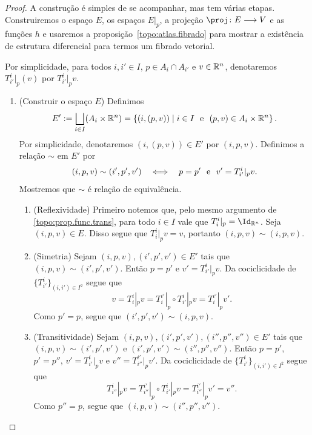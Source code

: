 \begin{proof}
A construção é simples de se acompanhar, mas tem várias etapas. Construiremos o espaço $E$, os espaços $E|_p$, a projeção $\proj\colon E \to V$ e as funções $h$ e usaremos a proposição~\ref{topo:atlas.fibrado} para mostrar a existência de estrutura diferencial para termos um fibrado vetorial.

Por simplicidade, para todos $i,i' \in I$, $p \in A_i \cap A_{i'}$ e $v \in \mathbb{R}^n$, denotaremos $T^i_{i'}|_p (v)$ por $T^i_{i'}|_p v$.
\begin{enumerate}
\item (Construir o espaço $E$) Definimos
	\begin{equation*}
	E' := \bigsqcup_{i \in I} (A_i \times \mathbb{R}^n) = \left\{(i,(p,v)) \;\middle\vert\; i \in I \text{\ \ e\ \ } (p,v) \in A_i \times \mathbb{R}^n \right\}.
	\end{equation*}
Por simplicidade, denotaremos $(i,(p,v)) \in E'$ por $(i,p,v)$. Definimos a relação $\sim$ em $E'$ por
	\begin{equation*}
	(i,p,v) \sim (i',p',v') \quad \Longleftrightarrow \quad p=p' \text{\ \ e\ \ } v'=T^i_{i'}|_p v.
	\end{equation*}
Mostremos que $\sim$ é relação de equivalência.
	
	\begin{enumerate}
	\item (Reflexividade) Primeiro notemos que, pelo mesmo argumento de \ref{topo:prop.func.trans}, para todo $i \in I$ vale que $T^i_i|_p = \Id_{\R^n}$. Seja $(i,p,v) \in E$. %
Disso segue que $T^i_i|_p v = v$, portanto $(i,p,v) \sim (i,p,v)$.
	
	\item (Simetria) Sejam $(i,p,v), (i',p',v') \in E'$ tais que $(i,p,v) \sim (i',p',v')$. Então $p=p'$ e $v'=T^i_{i'}|_p v$. Da %
cociclicidade de $\{T^i_{i'}\}_{(i,i') \in I^2}$ segue que
	\begin{equation*}
	v = T^i_i|_p v = T^{i'}_i|_p \circ T^i_{i'}|_p v = T^{i'}_i|_p v'.
	\end{equation*}
Como $p'=p$, segue que $(i',p',v') \sim (i,p,v)$.
	
	\item (Transitividade) Sejam $(i,p,v), (i',p',v'), (i'',p'',v'') \in E'$ tais que $(i,p,v) \sim (i',p',v')$ e $(i',p',v') \sim (i'',p'',v'')$. Então $p=p'$, $p'=p''$, $v'=T^i_{i'}|_p v$ e $v''=T^{i'}_{i''}|_p v'$. Da cociclicidade de $\{T^i_{i'}\}_{(i,i') \in I^2}$ segue que
	\begin{equation*}
	T^i_{i''}|_p v = T^{i'}_{i''}|_p \circ T^i_{i'}|_p v = T^{i'}_{i''}|_p v' = v''.
	\end{equation*}
Como $p''=p$, segue que $(i,p,v) \sim (i'',p'',v'')$.
	\end{enumerate}


\end{enumerate}
\end{proof}

